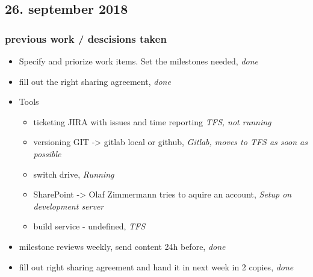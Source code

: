 \documentclass{article}
\begin{document}
        
    
\subsection{26. september 2018}

\subsubsection{previous work / descisions taken}
\begin{itemize}
    \item Specify and priorize work items. Set the milestones needed, \textit{done}
    \item fill out the right sharing agreement, \textit{done}
    \item Tools
        \begin{itemize}
            \item ticketing JIRA with issues and time reporting \textit{TFS, not running}
            \item versioning GIT -> gitlab local or github, \textit{Gitlab, moves to TFS as soon as possible}
            \item switch drive, \textit{Running}
            \item SharePoint -> Olaf Zimmermann tries to aquire an account, \textit{Setup on development server}
            \item build service - undefined, \textit{TFS}
        \end{itemize}
        \item milestone reviews weekly, send content 24h before, \textit{done}
        \item fill out right sharing agreement and hand it in next week in 2 copies, \textit{done}
\end{itemize}
\end{document}
